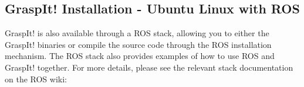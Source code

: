 \subsection{GraspIt! Installation - Ubuntu Linux with ROS}

GraspIt! is also available through a ROS stack, allowing you to either
the GraspIt! binaries or compile the source code through the ROS
installation mechanism. The ROS stack also provides examples of how to
use ROS and GraspIt! together. For more details, please see the
relevant stack documentation on the ROS wiki:


